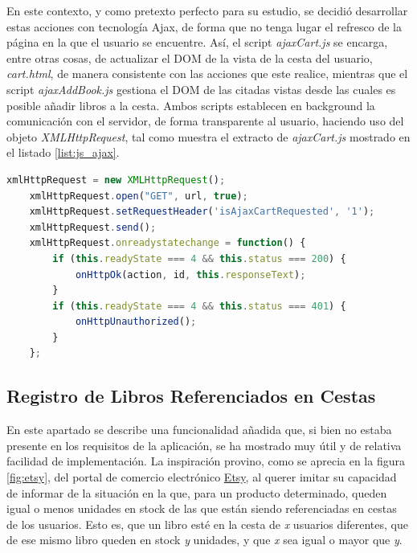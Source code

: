 \documentclass[a4paper]{article}
\begin{document}
    En este contexto, y como pretexto perfecto para su estudio, se decidió desarrollar estas acciones con tecnología Ajax, de forma que no tenga lugar el refresco de la página en la que el usuario se encuentre. Así, el script \emph{ajaxCart.js} se encarga, entre otras cosas, de actualizar el DOM de la vista de la cesta del usuario, \emph{cart.html}, de manera consistente con las acciones que este realice, mientras que el script \emph{ajaxAddBook.js} gestiona el DOM de las citadas vistas desde las cuales es posible añadir libros a la cesta. Ambos scripts establecen en background la comunicación con el servidor, de forma transparente al usuario, haciendo uso del objeto \emph{XMLHttpRequest}, tal como muestra el extracto de \emph{ajaxCart.js} mostrado en el listado \ref{list:js_ajax}.
    \\
    
    \begin{lstlisting}[language=JavaScript,caption=Comunicación Ajax con el servidor,label=list:js_ajax]
    xmlHttpRequest = new XMLHttpRequest();
    xmlHttpRequest.open("GET", url, true);
    xmlHttpRequest.setRequestHeader('isAjaxCartRequested', '1');
    xmlHttpRequest.send();
    xmlHttpRequest.onreadystatechange = function() {
    	if (this.readyState === 4 && this.status === 200) {
    		onHttpOk(action, id, this.responseText);
    	}
    	if (this.readyState === 4 && this.status === 401) {
    		onHttpUnauthorized();
    	}
    };
    \end{lstlisting}
    
    \subsection[Libros Referenciados ]{Registro de Libros Referenciados en Cestas}
    En este apartado se describe una funcionalidad añadida que, si bien no estaba presente en los requisitos de la aplicación, se ha mostrado muy útil y de relativa facilidad de implementación. La inspiración provino, como se aprecia en la figura \ref{fig:etsy}, del portal de comercio electrónico \href{https://www.etsy.com}{Etsy}, al querer imitar su capacidad de informar de la situación en la que, para un producto determinado, queden igual o menos unidades en stock de las que están siendo referenciadas en cestas de los usuarios. Esto es, que un libro esté en la cesta de \emph{x} usuarios diferentes, que de ese mismo libro queden en stock \emph{y} unidades, y que \emph{x} sea igual o mayor que \emph{y}.
    
\end{document}

